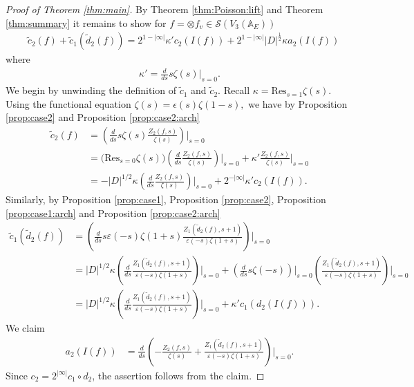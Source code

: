\documentclass[11pt,a4paper,reqno]{amsart}
\theoremstyle{remark}
\numberwithin{equation}{section}
\newcommand{\A}{\mathbb{A}}
\theoremstyle{definition}
\numberwithin{equation}{section}
\begin{document}
\begin{proof}[Proof of Theorem \ref{thm:main}]



By Theorem \ref{thm:Poisson:lift} and Theorem \ref{thm:summary} it remains to show for $f=\otimes f_v\in \mathcal{S}(V_3(\A_E))$
\begin{align*}
    &\tilde{c}_2(f)+\tilde{c}_1(\tilde{d}_{2}(f))=2^{1-|\infty|}\kappa' c_2(I(f))+2^{1-|\infty|}|D|^{\frac{1}{2}}\kappa a_2(I(f))
\end{align*}
where
\begin{align*}
    \kappa'=\frac{d}{ds}s\zeta(s)\bigg|_{s=0}.
\end{align*}
We begin by unwinding the definition of $\tilde{c}_1$ and $\tilde{c}_2$. Recall $\kappa=\mathrm{Res}_{s=1} \zeta(s).$ Using the functional equation $\zeta(s)=\epsilon(s)\zeta(1-s),$ we have by Proposition \ref{prop:case2} and Proposition \ref{prop:case2:arch}
\begin{align*}
    \tilde{c}_2(f)&= \left(\frac{d}{ds} s\zeta(s)\frac{Z_{2}(f,s)}{\zeta(s)}\right)\Bigg|_{s=0}\\
&=\big(\mathrm{Res}_{s=0}\zeta(s)\big)\left(\frac{d}{ds}\frac{Z_2(f,s)}{\zeta(s)}\right)\Bigg|_{s=0}+\kappa'\frac{Z_2(f,s)}{\zeta(s)}\Bigg|_{s=0}\\
    &=-|D|^{1/2}\kappa\left(\frac{d}{ds}\frac{Z_2(f,s)}{\zeta(s)}\right)\Bigg|_{s=0}+2^{-|\infty|}\kappa' c_2(I(f)).
\end{align*}
Similarly, by Proposition \ref{prop:case1}, Proposition \ref{prop:case2}, Proposition \ref{prop:case1:arch} and Proposition \ref{prop:case2:arch}
\begin{align*}
   \tilde{c}_1(\tilde{d}_{2}(f))&=  \left(\frac{d}{ds} s\varepsilon(-s)\zeta(1+s)\frac{Z_1(\tilde{d}_2(f),s+1)}{\varepsilon(-s)\zeta(1+s)}\right)\Bigg|_{s=0}\\
    &=|D|^{1/2}\kappa\left(\frac{d}{ds}\frac{Z_1(\tilde{d}_2(f),s+1)}{\varepsilon(-s)\zeta(1+s)}\right)\Bigg|_{s=0}+\left(\frac{d}{ds}s\zeta(-s)\right)\bigg|_{s=0} \left(\frac{Z_1(\tilde{d}_2(f),s+1)}{\varepsilon(-s)\zeta(1+s)}\right)\Bigg|_{s=0}\\
    &=|D|^{1/2}\kappa\left(\frac{d}{ds}\frac{Z_1(\tilde{d}_2(f),s+1)}{\varepsilon(-s)\zeta(1+s)}\right)\Bigg|_{s=0}+\kappa'  c_1(d_2(I(f))).
\end{align*}
We claim
\begin{align*}
    a_2(I(f))&=\frac{d}{ds}\left(-\frac{Z_2(f,s)}{\zeta(s)}+\frac{Z_1(\tilde{d}_2(f),s+1)}{\varepsilon(-s)\zeta(1+s)}\right)\Bigg|_{s=0}.
\end{align*}
Since $c_2=2^{|\infty|}c_1\circ d_2$, the assertion follows from the claim.


\end{proof}
\end{document}
